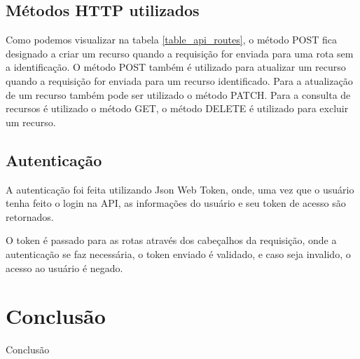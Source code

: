 \section{Métodos HTTP utilizados}

Como podemos visualizar na tabela \ref{table_api_routes}, o método POST fica designado a criar um recurso quando a requisição for enviada para uma rota sem a identificação. O método POST também é utilizado para atualizar um recurso quando a requisição for enviada para um recurso identificado. Para a atualização de um recurso também pode ser utilizado o método PATCH.
Para a consulta de recursos é utilizado o método GET, o método DELETE é utilizado para excluir um recurso.

\section{Autenticação}

A autenticação foi feita utilizando Json Web Token, onde, uma vez que o usuário tenha feito o login na API, as informações do usuário e seu token de acesso são retornados.

O token é passado para as rotas através dos cabeçalhos da requisição, onde a autenticação se faz necessária, o token enviado é validado, e caso seja invalido, o acesso ao usuário é negado.


\chapter{Conclusão}

Conclusão
